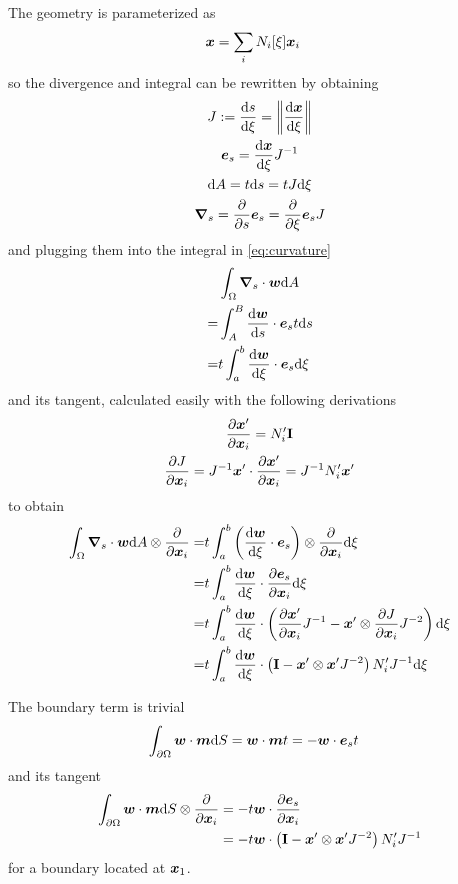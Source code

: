 \documentclass[a4paper,11pt]{article}
\renewcommand{\to}[1]{\text{\boldmath $#1$}} %
\newcommand{\ts}[1]{\text{\boldmath $\mathrm{#1}$}} %
\newcommand{\intd}[1]{\mathrm{d}#1}
\newcommand{\pderiv}[2]{\frac{\partial#1}{\partial#2}}
\newcommand{\dderiv}[2]{\frac{\mathrm{d}#1}{\mathrm{d}#2}}
\newcommand{\norm}[1]{\left\lVert{#1}\right\rVert}
\newcommand{\defeq}{:=}
\begin{document}
The geometry is parameterized as
\begin{align}
 \to x &= \sum_i N_i[\xi]\to x_i
\end{align}
so the divergence and integral can be rewritten by obtaining
\begin{gather}
 J \defeq \dderiv{s}{\xi} = \norm{\dderiv{\to x}{\xi}}\\
 \to e_s = \dderiv{\to x}{\xi} J^{-1}\\
 \intd A = t \intd s = t J \intd \xi\\
 \to \nabla_s = \pderiv{}{s}\to e_s = \pderiv{}{\xi}\to e_s J
\end{gather}
and plugging them into the integral in \eqref{eq:curvature}
\begin{align}
  &\int_\Omega\to \nabla_s\cdot\to w\intd A\\
 =&\int_A^B\dderiv{\to w}{s}\cdot\to e_s t \intd s\\
 =&t \int_a^b \dderiv{\to w}{\xi}\cdot \to e_s \intd\xi\\
\end{align}
and its tangent, calculated easily with the following derivations
\begin{gather}
 \pderiv{\to x'}{\to x_i} = N_i' \ts I\\
 \pderiv{J}{\to x_i} = J^{-1} \to x'\cdot \pderiv{\to x'}{\to x_i} = J^{-1} N_i' \to x'
\end{gather}
to obtain
\begin{align}
 \int_\Omega\to \nabla_s\cdot\to w\intd A \otimes \pderiv{}{\to x_i}
 =&t \int_a^b \left(\dderiv{\to w}{\xi}\cdot \to e_s\right)\otimes \pderiv{}{\to x_i}  \intd\xi\\
 =&t \int_a^b \dderiv{\to w}{\xi}\cdot \pderiv{\to e_s}{\to x_i} \intd\xi\\
 =&t \int_a^b \dderiv{\to w}{\xi}\cdot \left(\pderiv{\to x'}{\to x_i}J^{-1}-\to x'\otimes\pderiv{J}{\to x_i}J^{-2}\right) \intd\xi\\
 =&t \int_a^b \dderiv{\to w}{\xi}\cdot \left(\ts I-\to x'\otimes\to x' J^{-2}\right)N_i' J^{-1} \intd\xi
\end{align}

The boundary term is trivial
\begin{align}
 &\int_{\partial\Omega} \to w\cdot \to m\intd S = \to w \cdot\to m t = - \to w \cdot \to e_s t
\end{align}
and its tangent
\begin{align}
 \int_{\partial\Omega} \to w\cdot \to m\intd S\otimes \pderiv{}{\to x_i} &= -t \to w\cdot\pderiv{\to e_s}{\to x_i}\\
 &= -t \to w\cdot \left(\ts I-\to x'\otimes\to x' J^{-2}\right)N_i' J^{-1}
\end{align}
for a boundary located at $\to x_1$.
\end{document}
